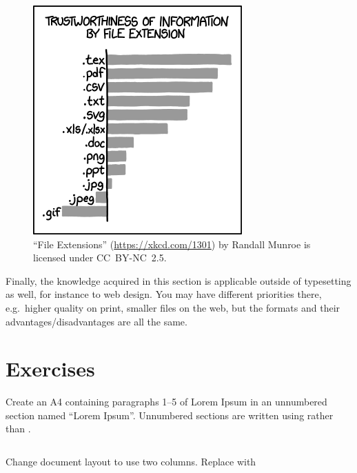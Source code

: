 {\begin{figure}
	\centering
	\includegraphics[scale=0.48,resolution=72]{graphics/file_extensions.png}
	\caption{``File Extensions'' (\url{https://xkcd.com/1301}) by Randall Munroe is licensed under \mbox{CC~BY-NC~2.5}.}
	\label{fig:latex:unicode}
\end{figure}

Finally, the knowledge acquired in this section is applicable outside of typesetting as well, for instance to web design. You may have different priorities there, e.g.\ higher quality on print, smaller files on the web, but the formats and their advantages/disadvantages are all the same.

\section{Exercises}
\begin{ExerciseList}
	\Exercise Create an A4  containing paragraphs 1--5 of Lorem Ipsum in an unnumbered section named ``Lorem Ipsum''. Unnumbered sections are written using \latexin{\section*} rather than \latexin{\section}.
	\Answer ~\\ \inputminted[frame=lines]{latex}{latex/exer_lipsum.tex}
	
	\Exercise Change document layout to use two columns.
	\Answer Replace
	with
	

\end{ExerciseList}}
